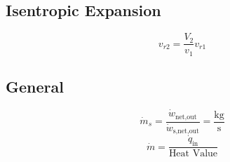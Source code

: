 \documentclass[10pt,landscape]{article}
\begin{document}
\begin{multicols}{3}
\subsection{Isentropic Expansion}
\begin{equation}
    v_{r2}=\frac{V_2}{v_1}v_{r1}
\end{equation}
\subsection{General}
\begin{equation}
    \dot{m}_s=\frac{\dot{w}_{\text{net,out}}}{\dot{w}_{\text{s,net,out}}}=\frac{\text{kg}}{\text{s}}
\end{equation}
\begin{equation}
    \dot{m}=\frac{\dot{q}_{\text{in}}}{\text{Heat Value}}    
\end{equation}





\end{multicols}
\end{document}

